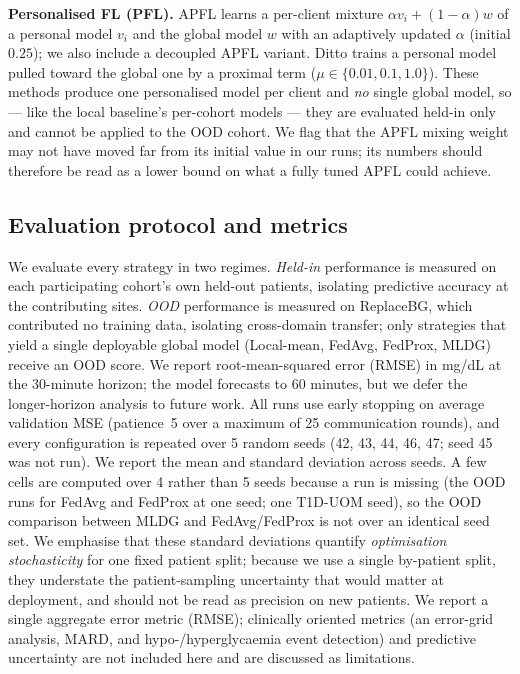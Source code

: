 \documentclass[10pt,letterpaper]{article}
\begin{document}
\textbf{Personalised FL (PFL).} APFL learns a per-client mixture
$\alpha v_i + (1-\alpha)w$ of a personal model $v_i$ and the global model $w$
with an adaptively updated $\alpha$ (initial $0.25$); we also include a decoupled
APFL variant. Ditto trains a personal model pulled toward the global one by a
proximal term ($\mu\in\{0.01,0.1,1.0\}$). These methods produce one personalised
model per client and \emph{no} single global model, so --- like the local
baseline's per-cohort models --- they are evaluated held-in only and cannot be
applied to the OOD cohort. We flag that the APFL mixing weight may not have moved
far from its initial value in our runs; its numbers should therefore be read as a
lower bound on what a fully tuned APFL could achieve.

\subsection*{Evaluation protocol and metrics}

We evaluate every strategy in two regimes. \emph{Held-in} performance is measured
on each participating cohort's own held-out patients, isolating predictive
accuracy at the contributing sites. \emph{OOD} performance is measured on
ReplaceBG, which contributed no training data, isolating cross-domain transfer;
only strategies that yield a single deployable global model (Local-mean, FedAvg,
FedProx, MLDG) receive an OOD score. We report root-mean-squared error (RMSE) in
mg/dL at the 30-minute horizon; the model forecasts to 60 minutes, but we defer
the longer-horizon analysis to future work. All runs use early stopping on
average validation MSE (patience~5 over a maximum of 25 communication rounds),
and every configuration is repeated over 5 random seeds (42, 43, 44, 46, 47; seed
45 was not run). We report the mean and standard deviation across seeds. A few
cells are computed over 4 rather than 5 seeds because a run is missing (the OOD
runs for FedAvg and FedProx at one seed; one T1D-UOM seed), so the OOD comparison
between MLDG and FedAvg/FedProx is not over an identical seed set. We emphasise
that these standard deviations quantify \emph{optimisation stochasticity} for one
fixed patient split; because we use a single by-patient split, they understate
the patient-sampling uncertainty that would matter at deployment, and should not
be read as precision on new patients. We report a single aggregate error metric
(RMSE); clinically oriented metrics (an error-grid analysis, MARD, and
hypo-/hyperglycaemia event detection) and predictive uncertainty are not included
here and are discussed as limitations.
\end{document}
